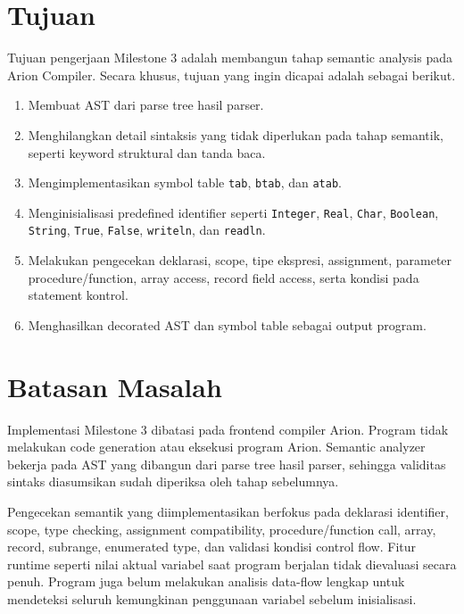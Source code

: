 \section{Tujuan}
Tujuan pengerjaan Milestone 3 adalah membangun tahap semantic analysis pada Arion Compiler. Secara khusus, tujuan yang ingin dicapai adalah sebagai berikut.

\begin{enumerate}
    \item Membuat AST dari parse tree hasil parser.
    \item Menghilangkan detail sintaksis yang tidak diperlukan pada tahap semantik, seperti keyword struktural dan tanda baca.
    \item Mengimplementasikan symbol table \texttt{tab}, \texttt{btab}, dan \texttt{atab}.
    \item Menginisialisasi predefined identifier seperti \texttt{Integer}, \texttt{Real}, \texttt{Char}, \texttt{Boolean}, \texttt{String}, \texttt{True}, \texttt{False}, \texttt{writeln}, dan \texttt{readln}.
    \item Melakukan pengecekan deklarasi, scope, tipe ekspresi, assignment, parameter procedure/function, array access, record field access, serta kondisi pada statement kontrol.
    \item Menghasilkan decorated AST dan symbol table sebagai output program.
\end{enumerate}

\section{Batasan Masalah}
Implementasi Milestone 3 dibatasi pada frontend compiler Arion. Program tidak melakukan code generation atau eksekusi program Arion. Semantic analyzer bekerja pada AST yang dibangun dari parse tree hasil parser, sehingga validitas sintaks diasumsikan sudah diperiksa oleh tahap sebelumnya.

Pengecekan semantik yang diimplementasikan berfokus pada deklarasi identifier, scope, type checking, assignment compatibility, procedure/function call, array, record, subrange, enumerated type, dan validasi kondisi control flow. Fitur runtime seperti nilai aktual variabel saat program berjalan tidak dievaluasi secara penuh. Program juga belum melakukan analisis data-flow lengkap untuk mendeteksi seluruh kemungkinan penggunaan variabel sebelum inisialisasi.

